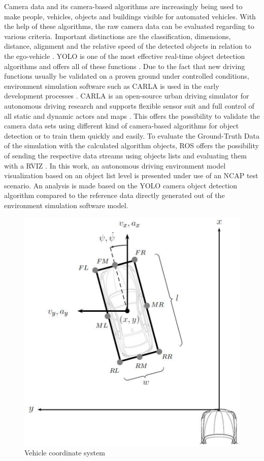 Camera data and its camera-based algorithms are increasingly being used to make people, vehicles, objects and buildings visible for automated vehicles. With the help of these algorithms, the raw camera data can be evaluated regarding to various criteria. Important distinctions are the classification, dimensions, distance, alignment and the relative speed of the detected objects in relation to the ego-vehicle \cite{Aeberhard}. \ac{YOLO} is one of the most effective real-time object detection algorithms and offers all of these functions \cite{knuthwebsite}. Due to the fact that new driving functions usually be validated on a proven ground under controlled conditions, environment simulation software such as CARLA is used in the early development processes \cite{Gap}. CARLA is an open-source urban driving simulator for autonomous driving research and supports flexible sensor suit and full control of all static and dynamic actors and maps \cite{Dosovitskiy17}. This offers the possibility to validate the camera data sets using different kind of camera-based algorithms for object detection or to train them quickly and easily. To evaluate the Ground-Truth Data of the simulation with the calculated algorithm objects, \ac{ROS} offers the possibility of sending the respective data streams using objects lists and evaluating them with a \ac{RVIZ} \cite{ROS}.
In this work, an autonomous driving environment model visualization based on an object list level is presented under use of an NCAP test scenario. An analysis is made based on the \ac{YOLO} camera object detection algorithm compared to the reference data directly generated out of the environment simulation software model.
\begin{figure}[]
	\centering
	\includegraphics[scale=0.4]{images/KoordinatenSystem}
	\caption{Vehicle coordinate system}
	\label{figurelabel2}
\end{figure}
